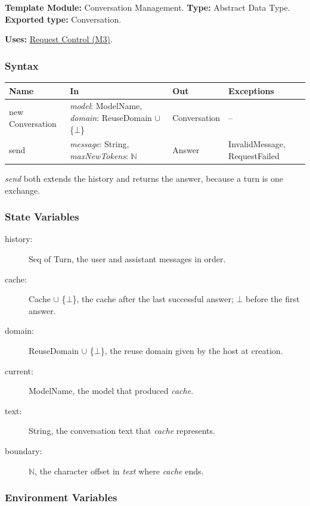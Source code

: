 \documentclass[12pt, titlepage]{article}
\begin{document}
\textbf{Template Module:} Conversation Management. \textbf{Type:} Abstract Data Type. \textbf{Exported type:} Conversation.

\textbf{Uses:} \hyperref[mCtrl]{Request Control (M3)}.

\subsubsection*{Syntax}

\begin{tabularx}{\textwidth}{l X l X}
\toprule
\textbf{Name} & \textbf{In} & \textbf{Out} & \textbf{Exceptions}\\
\midrule
new Conversation & \emph{model}: ModelName, \emph{domain}: ReuseDomain $\cup$ \{$\bot$\} & Conversation & --\\
send & \emph{message}: String, \emph{maxNewTokens}: $\mathbb{N}$ & Answer & InvalidMessage, RequestFailed\\
\bottomrule
\end{tabularx}

\emph{send} both extends the history and returns the answer, because a turn is
one exchange.

\subsubsection*{State Variables}

\begin{description}
\item[history:] Seq of Turn, the user and assistant messages in order.
\item[cache:] Cache $\cup$ \{$\bot$\}, the cache after the last successful answer; $\bot$ before the first answer.
\item[domain:] ReuseDomain $\cup$ \{$\bot$\}, the reuse domain given by the host at creation.
\item[current:] ModelName, the model that produced \emph{cache}.
\item[text:] String, the conversation text that \emph{cache} represents.
\item[boundary:] $\mathbb{N}$, the character offset in \emph{text} where \emph{cache} ends.
\end{description}

\subsubsection*{Environment Variables}
\end{document}
